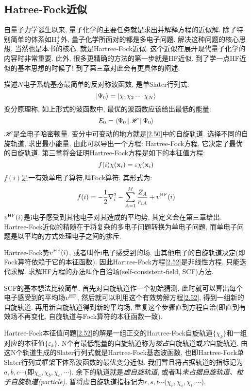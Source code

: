 \subsection{Hatree-Fock近似}
 \label{sec2.2.4}
自量子力学诞生以来, 
量子化学的主要任务就是求出并解释\sch 方程的近似解. 
除了特别简单的体系如$\text{H}^+_2$外, 
量子化学所面对的都是多电子问题. 
解决这种问题的核心思想, 
当然也是本书的核心, 
就是Hartree-Fock近似. 
这个近似在展开现代量子化学的内容时非常重要. 
此外, 
很多更精确的方法的第一步就是HF近似. 
到了学一点HF近似的基本思想的时候了! 到了第三章对此会有更具体的阐述.


描述$N$电子系统基态最简单的反对称波函数, 
是单Slater行列式:
\begin{equation}
\label{2.50}
\Ket{\Psi_0}=\Ket{\chi_1\chi_2\cdots\chi_N}
\end{equation}
变分原理称, 
如上形式的波函数中, 
最优的波函数应该给出最低的能量:
\begin{equation}
E_0=\Braket{\Psi_0|\mathscr{H}|\Psi_0}
\end{equation}
$\mathscr{H}$是全电子哈密顿量. 
变分中可变动的地方就是\ref{2.50}中的自旋轨道. 
选择不同的自旋轨道, 
求出最小能量, 
由此可以导出一个方程: Hartree-Fock方程, 
它决定了最优的自旋轨道. 
第三章将会证明Hartree-Fock方程是如下的本征值方程:
\begin{equation}
f(i)\chi(\mathbf{x}_i)=\varepsilon\chi(\mathbf{x}_i)
\label{2.52}
\end{equation}
$f(i)$是一有效单电子算符,叫Fock算符, 其形式为:
\begin{equation}
\label{2.53}
f(i)=-\frac{1}{2}\nabla_i^2 - \sum_{A=1}^M\frac{Z_A}{r_{iA}} + v^{\rm HF}(i)
\end{equation}
$v^{\rm HF}(i)$是i电子感受到其他电子对其造成的平均势, 其定义会在第三章给出. Hartree-Fock近似的精髓在于将复杂的多电子问题转换为单电子问题, 而单电子问题是以平均的方式处理电子之间的排斥.

Hartree-Fock势$v^{\rm HF}(i)$, 或者叫作i电子感受到的场, 由其他电子的自旋轨道决定(即Fock算符依赖于它的本征函数).  因此Hartree-Fock方程\ref{2.52}是非线性方程, 只能迭代求解. 求解HF方程的办法叫作自洽场(self-consistent-field, SCF)方法.

SCF的基本想法比较简单. 首先对自旋轨道作一个初始猜测, 此时就可以算出每个电子感受到的平均场$v^{\rm HF}$, 然后就可以利用这个有效势解方程\ref{2.52}, 得到一组新的自旋轨道. 再用新自旋轨道得到新的平均场, 重复这个步骤直到方程自洽(即直到有效场不再变化, 自旋轨道与Fock算符的本征函数一致).

Hartree-Fock本征值问题\ref{2.52}的解是一组正交的Hartree-Fock自旋轨道$\{\chi_k\}$和一组对应的本征值$\{\varepsilon_k\}$. N个有最低能量的自旋轨道称为\emph{被占}自旋轨道或\emph{穴}自旋轨道. 由这N个轨道生成的Slater行列式就是Hartree-Fock基态波函数, 也即Hartree-Fock单Slater行列式框架下体系波函数的最优变分近似. 我们暂且将占据轨道的指标记为$a,b,c\cdots$(即$\chi_a,\chi_b,\chi_c,\cdots$). 余下的轨道就是\emph{虚自旋轨道}, 或者叫\emph{未占据自旋轨道、粒子自旋轨道(particle)}. 暂将虚自旋轨道指标记为$r,s,t\cdots$($\chi_r,\chi_s,\chi_t,\cdots$).

